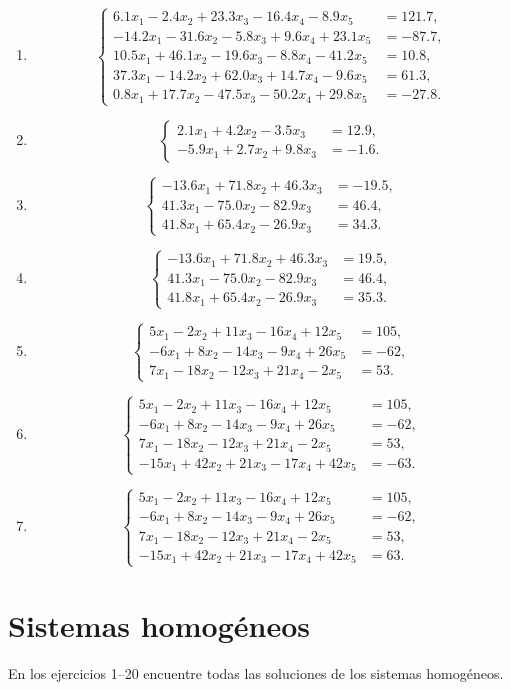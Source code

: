 \documentclass[12pt]{article}
\theoremstyle{remark}
\newcommand{\sistema}[1]{%
\[
\left\{
\begin{aligned}
#1
\end{aligned}
\right.
\]
}
\begin{document}
\begin{enumerate}[label=\textbf{\arabic*.},start=55,leftmargin=*]
\item \sistema{
6.1x_1-2.4x_2+23.3x_3-16.4x_4-8.9x_5&=121.7,\\
-14.2x_1-31.6x_2-5.8x_3+9.6x_4+23.1x_5&=-87.7,\\
10.5x_1+46.1x_2-19.6x_3-8.8x_4-41.2x_5&=10.8,\\
37.3x_1-14.2x_2+62.0x_3+14.7x_4-9.6x_5&=61.3,\\
0.8x_1+17.7x_2-47.5x_3-50.2x_4+29.8x_5&=-27.8.
}

\item \sistema{
2.1x_1+4.2x_2-3.5x_3&=12.9,\\
-5.9x_1+2.7x_2+9.8x_3&=-1.6.
}

\item \sistema{
-13.6x_1+71.8x_2+46.3x_3&=-19.5,\\
41.3x_1-75.0x_2-82.9x_3&=46.4,\\
41.8x_1+65.4x_2-26.9x_3&=34.3.
}

\item \sistema{
-13.6x_1+71.8x_2+46.3x_3&=19.5,\\
41.3x_1-75.0x_2-82.9x_3&=46.4,\\
41.8x_1+65.4x_2-26.9x_3&=35.3.
}

\item \sistema{
5x_1-2x_2+11x_3-16x_4+12x_5&=105,\\
-6x_1+8x_2-14x_3-9x_4+26x_5&=-62,\\
7x_1-18x_2-12x_3+21x_4-2x_5&=53.
}

\item \sistema{
5x_1-2x_2+11x_3-16x_4+12x_5&=105,\\
-6x_1+8x_2-14x_3-9x_4+26x_5&=-62,\\
7x_1-18x_2-12x_3+21x_4-2x_5&=53,\\
-15x_1+42x_2+21x_3-17x_4+42x_5&=-63.
}

\item \sistema{
5x_1-2x_2+11x_3-16x_4+12x_5&=105,\\
-6x_1+8x_2-14x_3-9x_4+26x_5&=-62,\\
7x_1-18x_2-12x_3+21x_4-2x_5&=53,\\
-15x_1+42x_2+21x_3-17x_4+42x_5&=63.
}

\end{enumerate}

\section{Sistemas homogéneos}

En los ejercicios 1--20 encuentre todas las soluciones de los sistemas homogéneos.
\end{document}
